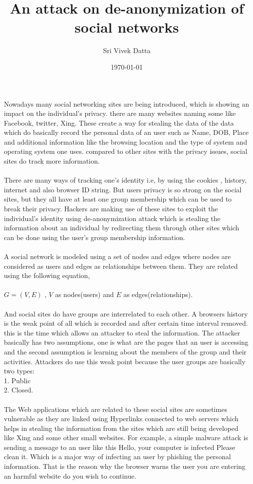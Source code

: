 \documentclass[a4paper]{article}
\title{An attack on de-anonymization of social networks }
\author{Sri Vivek Datta}
\date{\today}
\begin{document}
\maketitle
Nowadays many social networking sites are being introduced, which is showing an impact on the individual's privacy. there are many websites naming some like Facebook, twitter, Xing. These create a way for stealing the data of the data which do basically record the personal data of an user such as Name, DOB, Place and additional information like the browsing location and the type of system and operating system one uses. compared to other sites with the privacy issues, social sites do track more information.
\\
\\
There are many ways of tracking one's identity i.e, by using the cookies , history, internet and also browser ID string. But users privacy is so strong on the social sites, but they all have at least one group membership which can be used to break their privacy. Hackers are making use of these sites to exploit the individual's identity using de-anonymization attack which is stealing the information about an individual by redirecting them through other sites which can be done using the user's group membership information.
\\
\\
A social network is modeled using a set of nodes and edges where nodes are considered as users and edges as relationships between them. They are related using the following equation,
\\
\\
$G= (V,E)$ , $V$ as nodes(users)
and $E$ as edges(relationships).
\\
\\
And social sites do have groups are interrelated to each other. A browsers history is the weak point of all which is recorded and after certain time interval removed. this is the time which allows an attacker to steal the information. The attacker basically has two assumptions, one is what are the pages that an user is accessing and the second assumption is learning about the members of the group and their activities. Attackers do use this weak point because the user groups are basically two types:
\\ 
1. Public\\
2. Closed.\\
\\
The Web applications which are related to these social sites are sometimes vulnerable as they are linked using Hyperlinks connected to web servers which helps in stealing the information from the sites which are still being developed like Xing and some other small websites. For example, a simple malware attack is sending a message to an user like this Hello, your computer is infected Please clean it. Which is a major way of infecting an user by phishing the personal information. That is the reason why the browser warns the user you are entering an harmful website do you wish to continue.
\end{document}
